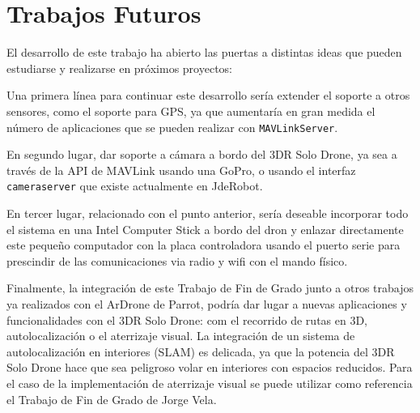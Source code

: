 \section{Trabajos Futuros}

El desarrollo de este trabajo ha abierto las puertas a distintas ideas que pueden estudiarse y realizarse en próximos proyectos:

Una primera línea para continuar este desarrollo sería extender el soporte a otros sensores, como el soporte para GPS, ya que aumentaría en gran medida el número de aplicaciones que se pueden realizar con \texttt{MAVLinkServer}. 

En segundo lugar, dar soporte a cámara a bordo del 3DR Solo Drone, ya sea a través de la API de MAVLink usando una GoPro, o usando el interfaz \texttt{cameraserver} que existe actualmente en JdeRobot.

En tercer lugar, relacionado con el punto anterior, sería deseable incorporar todo el sistema en una Intel Computer Stick a bordo del dron y enlazar directamente este pequeño computador con la placa controladora usando el puerto serie para prescindir de las comunicaciones via radio y wifi con el mando físico. 

Finalmente, la integración de este Trabajo de Fin de Grado junto a otros trabajos ya realizados con el ArDrone de Parrot, podría dar lugar a nuevas aplicaciones y funcionalidades con el 3DR Solo Drone: com el recorrido de rutas en 3D, autolocalización o el aterrizaje visual. La integración de un sistema de autolocalización en interiores (SLAM) es delicada, ya que la potencia del 3DR Solo Drone hace que sea peligroso volar en interiores con espacios reducidos. Para el caso de la implementación de aterrizaje visual se puede utilizar como referencia el Trabajo de Fin de Grado de Jorge Vela\cite{jorgeVela}.